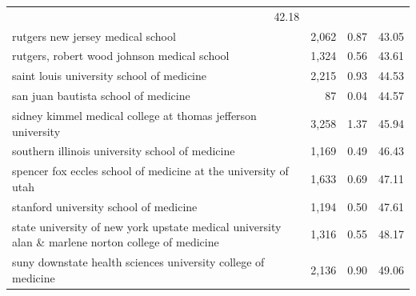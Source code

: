 \begin{table}[!h]
\begin{tabular}{llll}
  \multicolumn{1}{r}{42.18} \\
\multicolumn{1}{l}{\hspace{1em}rutgers new jersey medical school} &
  \multicolumn{1}{r}{2,062} &
  \multicolumn{1}{r}{0.87} &
  \multicolumn{1}{r}{43.05} \\
\multicolumn{1}{l}{\hspace{1em}rutgers, robert wood johnson medical school} &
  \multicolumn{1}{r}{1,324} &
  \multicolumn{1}{r}{0.56} &
  \multicolumn{1}{r}{43.61} \\
\multicolumn{1}{l}{\hspace{1em}saint louis university school of medicine} &
  \multicolumn{1}{r}{2,215} &
  \multicolumn{1}{r}{0.93} &
  \multicolumn{1}{r}{44.53} \\
\multicolumn{1}{l}{\hspace{1em}san juan bautista school of medicine} &
  \multicolumn{1}{r}{87} &
  \multicolumn{1}{r}{0.04} &
  \multicolumn{1}{r}{44.57} \\
\multicolumn{1}{l}{\hspace{1em}sidney kimmel medical college at thomas jefferson university} &
  \multicolumn{1}{r}{3,258} &
  \multicolumn{1}{r}{1.37} &
  \multicolumn{1}{r}{45.94} \\
\multicolumn{1}{l}{\hspace{1em}southern illinois university school of medicine} &
  \multicolumn{1}{r}{1,169} &
  \multicolumn{1}{r}{0.49} &
  \multicolumn{1}{r}{46.43} \\
\multicolumn{1}{l}{\hspace{1em}spencer fox eccles school of medicine at the university of utah} &
  \multicolumn{1}{r}{1,633} &
  \multicolumn{1}{r}{0.69} &
  \multicolumn{1}{r}{47.11} \\
\multicolumn{1}{l}{\hspace{1em}stanford university school of medicine} &
  \multicolumn{1}{r}{1,194} &
  \multicolumn{1}{r}{0.50} &
  \multicolumn{1}{r}{47.61} \\
\multicolumn{1}{l}{\hspace{1em}state university of new york upstate medical university alan \& marlene norton college of medicine} &
  \multicolumn{1}{r}{1,316} &
  \multicolumn{1}{r}{0.55} &
  \multicolumn{1}{r}{48.17} \\
\multicolumn{1}{l}{\hspace{1em}suny downstate health sciences university college of medicine} &
  \multicolumn{1}{r}{2,136} &
  \multicolumn{1}{r}{0.90} &
  \multicolumn{1}{r}{49.06} \\

\end{tabular}
\end{table}
